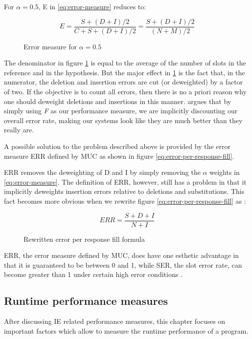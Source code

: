 For $\alpha = 0.5$, E in \ref{eq:error-measure} reduces to:

\begin{figure}[H]
\begin{displaymath}
	E = \frac{S + (D+I)/2}{C+S+(D+I)/2} = \frac{S + (D+I)/2}{(N+M)/2}
\end{displaymath}
\caption{Error measure for $\alpha = 0.5$}
\label{eq:error-measure2}
\end{figure}

The denominator in figure \ref{eq:error-measure2} is equal to the average of the number of slots in the reference and in the hypothesis. But the major effect in \ref{eq:error-measure2} is the fact that, in the numerator, the deletion and insertion errors are cut (or deweighted) by a factor of two. If the objective is to count all errors, then there is no a priori reason why one should deweight deletions and insertions in this manner.  \cite{Makhoul:1999} argues that by simply using \textit{F} as our performance measure, we are implicitly discounting our overall error rate, making our systems look like they are much better than they really are.

A possible solution to the problem described above is provided by the error measure ERR defined by MUC \cite{Chinchor:1995}\cite{Makhoul:1999} as shown in figure \ref{eq:error-per-response-fill}.

ERR removes the deweighting of D and I by simply removing the $\alpha$ weights in \ref{eq:error-measure}. The definition of ERR, however, still has a problem in that it implicitly deweights insertion errors relative to deletions and substitutions. This fact becomes more obvious when we rewrite figure \ref{eq:error-per-response-fill} as \cite{Makhoul:1999}:

\begin{figure}[H]
\begin{displaymath}
	ERR = \frac{S+D+I}{N+I}
\end{displaymath}
\caption{Rewritten error per response fill formula}
\label{eq:error-per-response-fill2}
\end{figure}

ERR, the error measure defined by MUC, does have one esthetic advantage in that it is guaranteed to be between 0 and 1, while SER, the slot error rate, can become greater than 1 under certain high error conditions \cite{Makhoul:1999}.

\newpage
\subsection{Runtime performance measures}
After discussing \gls{IE} related performance measures, this chapter focuses on important factors which allow to measure the runtime performance of a program.

